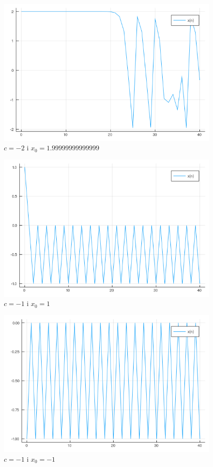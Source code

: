 \documentclass{article}
\begin{document}
\begin{figure}[H]
	\includegraphics[width=\linewidth]{zad6_3.png}
	\caption{$c=-2$ i $x_{0}=1.99999999999999$}
	\label{fig:z63}
\end{figure}
\begin{figure}[H]
	\includegraphics[width=\linewidth]{zad6_4.png}
	\caption{$c=-1$ i $x_{0}=1$}
	\label{fig:z64}
\end{figure}
\begin{figure}[H]
	\includegraphics[width=\linewidth]{zad6_5.png}
	\caption{$c=-1$ i $x_{0}=-1$}
	\label{fig:z65}
\end{figure}
\end{document}
